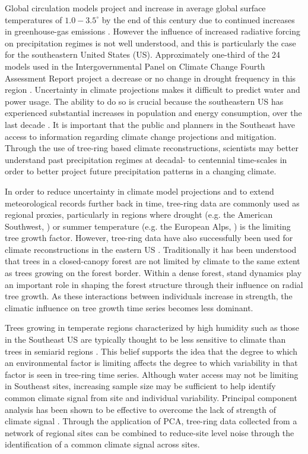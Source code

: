 \documentclass[11pt]{article}
\begin{document}
Global circulation models project and increase in average global surface temperatures of $1.0-3.5^{\circ}$ by the end of this century due to continued increases in greenhouse-gas emissions \cite{pachauri2007climate, kattenberg1996climate}. However the influence of increased radiative forcing on precipitation regimes is not well understood, and this is particularly the case for the southeastern United States (US). Approximately one-third of the 24 models used in the Intergovernmental Panel on Climate Change Fourth Assessment Report project a decrease or no change in drought frequency in this region \cite{pachauri2007climate, seager2009drought}.  Uncertainty  in climate projections makes it difficult to predict water and power usage. The ability to do so is crucial because the southeastern US has experienced substantial increases in population and energy consumption, over the last decade \cite{seager2009drought, sobolowski2012evaluation}. It is important that the public and planners in the Southeast have access to information regarding climate change projections and mitigation. Through the use of tree-ring based climate reconstructions, scientists may better understand past precipitation regimes at decadal- to centennial time-scales in order to better project future precipitation patterns in a changing climate. 

In order to reduce uncertainty in climate model projections and to extend meteorological records further back in time, tree-ring data are commonly used as regional proxies, particularly in regions where drought (e.g. the American Southwest, \cite{cook2004long}) or summer temperature (e.g. the European Alps, \cite{buntgen2007growth}) is the limiting tree growth factor. However, tree-ring data have also successfully been used for climate reconstructions in the eastern US \cite{leblanc1993temporal, stahle1993, cook1999drought}. Traditionally it has been understood that trees in a closed-canopy forest are not limited by climate to the same extent as trees growing on the forest border. Within a dense forest, stand dynamics play an important role in shaping the forest structure through their influence on radial tree growth. As these interactions between individuals increase in strength, the climatic influence on tree growth time series becomes less dominant. 

Trees growing in temperate regions characterized by high humidity such as those in the Southeast US are typically thought to be less sensitive to climate than trees in semiarid regions \cite{phipps1982comments}. This belief supports the idea that the degree to which an environmental factor is limiting affects the degree to which variability in that factor is seen in tree-ring time series. Although water access may not be limiting in Southeast sites, increasing sample size may be sufficient to help identify common climate signal from site and individual variability. Principal component analysis has been shown to be effective to overcome the lack of strength of climate signal \cite{anchukaitis2006forward, jacoby1989reconstructed}. Through the application of PCA, tree-ring data collected from a network of regional sites can be combined to reduce-site level noise through the identification of a common climate signal across sites.
\end{document}
